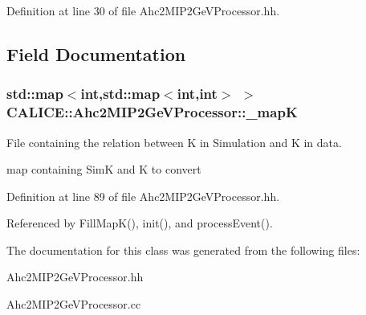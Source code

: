 Definition at line 30 of file Ahc2\-M\-I\-P2\-Ge\-V\-Processor.\-hh.



\subsection{Field Documentation}
\subsubsection[{\-\_\-map\-K}]{\setlength{\rightskip}{0pt plus 5cm}std\-::map$<$int,std\-::map$<$int,int$>$ $>$ C\-A\-L\-I\-C\-E\-::\-Ahc2\-M\-I\-P2\-Ge\-V\-Processor\-::\-\_\-map\-K\hspace{0.3cm}{\ttfamily [protected]}}\label{classCALICE_1_1Ahc2MIP2GeVProcessor_a796ade5fb97078104c67acf0b6a6b77e}


File containing the relation between K in Simulation and K in data. 

map containing Sim\-K and K to convert 

Definition at line 89 of file Ahc2\-M\-I\-P2\-Ge\-V\-Processor.\-hh.



Referenced by Fill\-Map\-K(), init(), and process\-Event().



The documentation for this class was generated from the following files\-:\begin{DoxyCompactItemize}
\item 
Ahc2\-M\-I\-P2\-Ge\-V\-Processor.\-hh\item 
Ahc2\-M\-I\-P2\-Ge\-V\-Processor.\-cc\end{DoxyCompactItemize}
